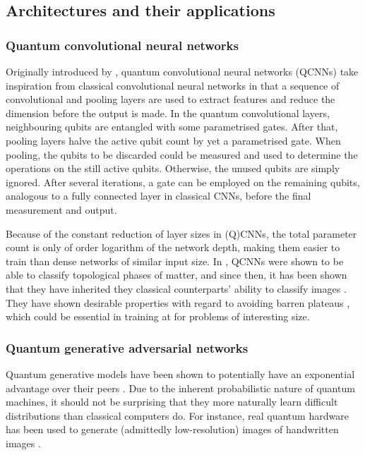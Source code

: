 \subsection{Architectures and their applications}
\subsubsection{Quantum convolutional neural networks}
\label{sec:qcnn}
Originally introduced by \textcite{cong2019}, quantum convolutional neural networks (QCNNs) take inspiration from classical convolutional neural networks in that a sequence of convolutional and pooling layers are used to extract features and reduce the dimension before the output is made.
In the quantum convolutional layers, neighbouring qubits are entangled with some parametrised gates.
After that, pooling layers halve the active qubit count by yet a parametrised gate.
When pooling, the qubits to be discarded could be measured and used to determine the operations on the still active qubits.
Otherwise, the unused qubits are simply ignored.
After several iterations, a gate can be employed on the remaining qubits, analogous to a fully connected layer in classical CNNs, before the final measurement and output.

Because of the constant reduction of layer sizes in (Q)CNNs, the total parameter count is only of order logarithm of the network depth, making them easier to train than dense networks of similar input size.
In \cite{cong2019}, QCNNs were shown to be able to classify topological phases of matter, and since then, it has been shown that they have inherited they classical counterparts' ability to classify images \cite{oh2020}.
They have shown desirable properties with regard to avoiding barren plateaus \cite{pesah2021}, which could be essential in training at for problems of interesting size.

\subsubsection{Quantum generative adversarial networks}
Quantum generative models have been shown to potentially have an exponential advantage over their peers \cite{gao2018}.
Due to the inherent probabilistic nature of quantum machines, it should not be surprising that they more naturally learn difficult distributions than classical computers do.
For instance, real quantum hardware has been used to generate (admittedly low-resolution) images of handwritten images \cite{huang2021}.


